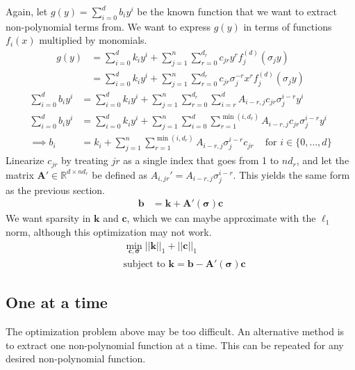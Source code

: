 \documentclass{article}
\let\vec\mathbf
\def\real{\mathbb{R}}
\begin{document}
Again, let $g(y) = \sum_{i=0}^d b_i y^i$ be the known function that we want
to extract non-polynomial terms from. We want to express $g(y)$ in terms of
functions $f_i(x)$ multiplied by monomials.
\begin{align*}
g(y) &= \sum_{i=0}^d k_i y^i + \sum_{j=1}^n \sum_{r=0}^{d_r} c_{jr} y^r f_j^{(d)}(\sigma_j y)
\\   &= \sum_{i=0}^d k_i y^i + \sum_{j=1}^n \sum_{r=0}^{d_r} c_{jr} \sigma_j^{-r} x^r f_j^{(d)}(\sigma_j y)
\end{align*}
\begin{align*}
\sum_{i=0}^d b_i y^i &= \sum_{i=0}^d k_i y^i + \sum_{j=1}^n \sum_{r=0}^{d_r} \sum_{i=r}^d A_{i-r,j} c_{jr} \sigma_j^{i-r} y^i \\
\sum_{i=0}^d b_i y^i &= \sum_{i=0}^d k_i y^i + \sum_{j=1}^n \sum_{i=0}^d \sum_{r=1}^{\min(i,d_r)} A_{i-r,j} c_{jr} \sigma_j^{i-r} y^i
\\ \implies b_i &= k_i + \sum_{j=1}^n \sum_{r=1}^{\min(i,d_r)}  A_{i-r,j} \sigma_j^{i-r} c_{jr}
\,\,\,\,\, \text{ for $i \in \{0, \hdots, d\}$}
\end{align*}
Linearize $c_{jr}$ by treating $jr$ as a single index that goes from 1 to $nd_r$,
and let the matrix $\vec{A}' \in \real^{d \times nd_r}$ be defined as $A_{i,jr}' =
A_{i-r,j}\sigma_j^{i-r}$. This yields the same form as the previous section.
\begin{align*}
\vec{b} &= \vec{k} + \vec{A}'(\vec{\sigma}) \vec{c}
\end{align*}
We want sparsity in $\vec{k}$ and $\vec{c}$, which we can maybe approximate with
the $\ell_1$ norm, although this optimization may not work.
\begin{align*}
&\min_{\vec{c},\vec{\sigma}} ||\vec{k}||_1 + ||\vec{c}||_1
\\& \text{subject to } \vec{k} =  \vec{b} - \vec{A}'(\vec{\sigma})\vec{c}
\end{align*}

\subsection{One at a time}

The optimization problem above may be too difficult. An alternative method is to
extract one non-polynomial function at a time. This can be repeated for any
desired non-polynomial function.
\end{document}
